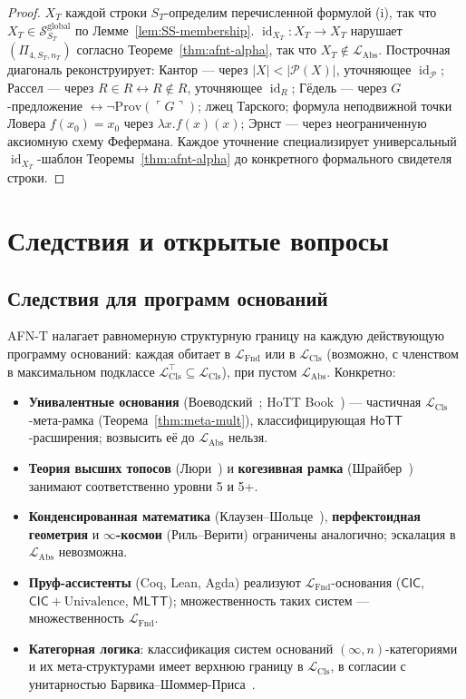 \documentclass[11pt]{article}
\theoremstyle{plain}
\theoremstyle{definition}
\newcommand{\cS}{\mathcal{S}}
\newcommand{\cP}{\mathcal{P}}
\newcommand{\LFnd}{\mathcal{L}_{\mathrm{Fnd}}}
\newcommand{\LCls}{\mathcal{L}_{\mathrm{Cls}}}
\newcommand{\LClsMax}{\mathcal{L}_{\mathrm{Cls}}^{\top}}
\newcommand{\LAbs}{\mathcal{L}_{\mathrm{Abs}}}
\newcommand{\MLTT}{\mathsf{MLTT}}
\newcommand{\HoTT}{\mathsf{HoTT}}
\newcommand{\CIC}{\mathsf{CIC}}
\DeclareMathOperator{\id}{id}
\begin{document}
\begin{proof}
$X_T$ каждой строки $S_T$-определим перечисленной формулой (i), так что $X_T \in \cS_{S_T}^{\mathrm{global}}$ по Лемме~\ref{lem:SS-membership}. $\id_{X_T} : X_T \to X_T$ нарушает $(\Pi_{4, S_T, n_T})$ согласно Теореме~\ref{thm:afnt-alpha}, так что $X_T \notin \LAbs$. Построчная диагональ реконструирует: Кантор — через $|X| < |\cP(X)|$, уточняющее $\id_{\cP}$; Рассел — через $R \in R \leftrightarrow R \notin R$, уточняющее $\id_R$; Гёдель — через $G$-предложение $\leftrightarrow \neg\mathrm{Prov}(\ulcorner G \urcorner)$; лжец Тарского; формула неподвижной точки Ловера $f(x_0) = x_0$ через $\lambda x. f(x)(x)$; Эрнст — через неограниченную аксиомную схему Фефермана. Каждое уточнение специализирует универсальный $\id_{X_T}$-шаблон Теоремы~\ref{thm:afnt-alpha} до конкретного формального свидетеля строки.
\end{proof}

\section{Следствия и открытые вопросы}\label{sec:consequences}

\subsection{Следствия для программ оснований}

AFN-T налагает равномерную структурную границу на каждую действующую программу оснований: каждая обитает в $\LFnd$ или в $\LCls$ (возможно, с членством в максимальном подклассе $\LClsMax \subseteq \LCls$), при пустом $\LAbs$. Конкретно:
\begin{itemize}\setlength{\itemsep}{1pt}
\item \textbf{Унивалентные основания} (Воеводский~\cite{VoevodskyFoundations2010}; HoTT Book~\cite{HoTTBook2013}) — частичная $\LCls$-мета-рамка (Теорема~\ref{thm:meta-mult}), классифицирующая $\HoTT$-расширения; возвысить её до $\LAbs$ нельзя.
\item \textbf{Теория высших топосов} (Люри~\cite{LurieHTT}) и \textbf{когезивная рамка} (Шрайбер~\cite{Schreiber2013}) занимают соответственно уровни 5 и 5+.
\item \textbf{Конденсированная математика} (Клаузен--Шольце~\cite{ClausenScholze2019}), \textbf{перфектоидная геометрия} и \textbf{$\infty$-космои} (Риль--Верити) ограничены аналогично; эскалация в $\LAbs$ невозможна.
\item \textbf{Пруф-ассистенты} (Coq, Lean, Agda) реализуют $\LFnd$-основания ($\CIC$, $\CIC + \mathrm{Univalence}$, $\MLTT$); множественность таких систем — множественность $\LFnd$.
\item \textbf{Категорная логика}: классификация систем оснований $(\infty, n)$-категориями и их мета-структурами имеет верхнюю границу в $\LCls$, в согласии с унитарностью Барвика--Шоммер-Приса~\cite{BarwickSchommerPries2021}.
\end{itemize}
\end{document}

